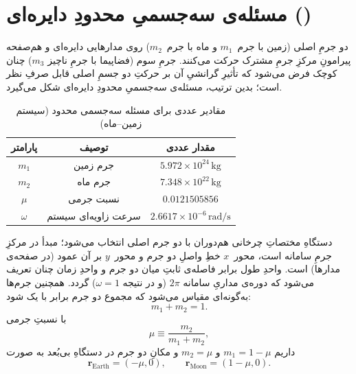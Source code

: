 
\section{مسئله‌ی سه‌جسمیِ محدودِ دایره‌ای ()}\label{sec:crtbp}

دو جرمِ اصلی (زمین
با جرم~$m_{1}$ و ماه با جرم~$m_{2}$) روی مدارهایی دایره‌ای و هم‌صفحه پیرامونِ مرکزِ جرمِ مشترک حرکت می‌کنند. جرمِ سوم (فضاپیما با جرمِ ناچیز $m_{3}$) چنان کوچک فرض می‌شود که تأثیرِ گرانشیِ آن بر حرکتِ دو جسمِ اصلی قابل صرفِ نظر است؛ بدین ترتیب، مسئله‌ی سه‌جسمیِ محدودِ دایره‌ای شکل می‌گیرد.



\begin{table}[H]
	\centering
	\caption{مقادیر عددی برای مسئله سه‌جسمی محدود (سیستم زمین–ماه)}
	\begin{tabular}{|c|c|c|}
		\hline
		پارامتر & توصیف & مقدار عددی \\
		\hline
		$m_1$ & جرم زمین & $5.972 \times 10^{24}\,\mathrm{kg}$ \\
		$m_2$ & جرم ماه & $7.348 \times 10^{22}\,\mathrm{kg}$ \\
		$\mu$ & نسبت جرمی & $0.0121505856$ \\
		$\omega$ & سرعت زاویه‌ای سیستم & $2.6617 \times 10^{-6}\,\mathrm{rad/s}$ \\
		\hline
	\end{tabular}
	\label{tab:params}
\end{table}



دستگاهِ مختصاتِ چرخانی هم‌دوران با دو جرم اصلی انتخاب می‌شود؛ مبدأ در مرکزِ جرمِ سامانه است، محور~$x$ خطِ واصلِ دو جرم و محور~$y$ بر آن عمود (در صفحه‌ی مدارها) است. واحدِ طول برابر فاصله‌ی ثابتِ میان دو جرم و واحدِ زمان چنان تعریف می‌شود که دوره‌ی مداریِ سامانه $2\pi$ (و در نتیجه $\omega=1$) گردد. همچنین جرم‌ها به‌گونه‌ای مقیاس می‌شود که مجموع دو جرم برابر با یک شود:
\begin{equation}
	 m_{1}+m_{2}=1.
\end{equation}
با نسبتِ جرمی
\begin{equation}
	\mu\equiv\frac{m_{2}}{m_{1}+m_{2}},
\end{equation}
داریم $m_{1}=1-\mu$ و $m_{2}=\mu$ و مکانِ دو جرم در دستگاهِ بی‌بُعد به صورت
\begin{equation}
	\mathbf r_{\text{Earth}}=(-\mu,0),\qquad \mathbf r_{\text{Moon}}=(1-\mu,0).
\end{equation}


